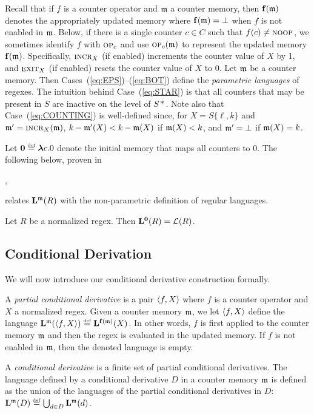 \documentclass[acmsmall,screen]{acmart}
\newif\ifTR
\begin{document}
Recall that if $f$ is a counter operator and $\mem$ a counter memory, then
$\Update{f}(\mem)$ denotes the appropriately updated memory where
$\Update{f}(\mem)=\bot$ when $f$ is not enabled in $\mem$. 
%
Below, if there is a single counter $c \in C$ such that $f(c) \neq \NoOp$, we
sometimes identify $f$ with $\Op[c]$ and use $\Op[c](\mem)$ to represent the
updated memory $\Update{f}(\mem)$.
%
Specifically, $\IncrOp[X]$ (if enabled) increments the counter value of $X$ by
1, and $\ExitOp[X]$ (if enabled) resets the counter value of $X$ to 0.
%
Let $\mem$ be a counter memory. 
%
Then Cases~(\ref{eq:EPS})--(\ref{eq:BOT}) define the \emph{parametric languages}
of regexes.
%
The intuition behind Case~(\ref{eq:STAR}) is that all counters that may be
present in $S$ are inactive on the level of $S{*}$.
%
Note also that Case~(\ref{eq:COUNTING}) is well-defined since, for $X =
S\{\ell,k\}$ and $\mem'=\IncrOp[X](\mem)$, $k-\mem'(X) < k-\mem(X)$ if
$\mem(X)< k$, and $\mem'=\bot$ if $\mem(X)= k$. 

Let $\memInit \eqdef \blambda c.0$ denote the initial memory that maps all
counters to 0.
%
The following below, proven in
\ifTR
Appendix~\ref{app:thmLANG},
\else
\cite{OOPSLA20TR},
\fi
relates
$\LANG{\mem}{R}$ with the non-parametric definition of regular languages.

\begin{theorem}
 \label{thm:LANG}
 Let $R$ be a normalized regex. Then $\LANG{\memInit}{R}=\langof{R}$.
\end{theorem}

\subsection{Conditional Derivation}

We will now introduce our conditional derivative construction
formally.  

A \emph{partial conditional derivative} is a pair $\pair{f}{X}$ where $f$ is a
counter operator and $X$ a normalized regex.
%
Given a counter memory $\mem$, we let $\pair{f}{X}$ define the language
$\LANG{\mem}{\pair{f}{X}} \eqdef \LANG{\Update{f}(\mem)}{X}$.
%
In other words, $f$ is first applied to the counter memory $\mem$ and then the
regex is evaluated in the updated memory.
%
If $f$ is not enabled in $\mem$, then the denoted language is empty.

A \emph{conditional derivative} is a finite set of partial conditional
derivatives.
%
The language defined by a conditional derivative $D$ in a counter memory $\mem$
is defined as the union of the languages of the partial conditional derivatives
in $D$: $\LANG{\mem}{D} \eqdef \bigcup_{d\in D} \LANG{\mem}{d}$.
\end{document}
